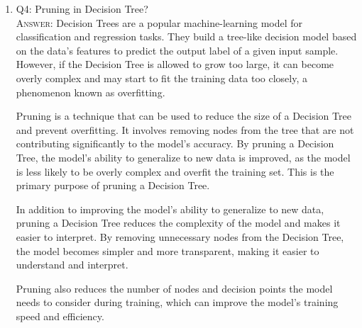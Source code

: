 \documentclass[11pt]{article}
\begin{document}
\begin{enumerate}
\item Q4: Pruning in Decision Tree?\\
\textsc{Answer:} Decision Trees are a popular machine-learning model for classification and regression tasks. They build a tree-like decision model based on the data's features to predict the output label of a given input sample. However, if the Decision Tree is allowed to grow too large, it can become overly complex and may start to fit the training data too closely, a phenomenon known as overfitting. 

Pruning is a technique that can be used to reduce the size of a Decision Tree and prevent overfitting. It involves removing nodes from the tree that are not contributing significantly to the model's accuracy. By pruning a Decision Tree, the model's ability to generalize to new data is improved, as the model is less likely to be overly complex and overfit the training set. This is the primary purpose of pruning a Decision Tree.

In addition to improving the model's ability to generalize to new data, pruning a Decision Tree reduces the complexity of the model and makes it easier to interpret. By removing unnecessary nodes from the Decision Tree, the model becomes simpler and more transparent, making it easier to understand and interpret.

Pruning also reduces the number of nodes and decision points the model needs to consider during training, which can improve the model's training speed and efficiency.






\end{enumerate}
\end{document}
